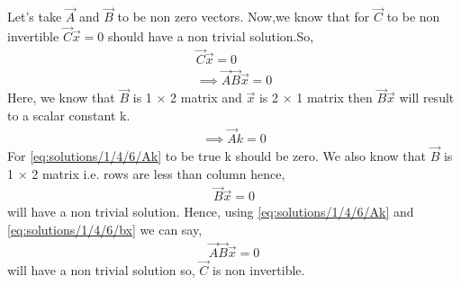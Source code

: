 %
 Let's take $\vec{A}$ and $\vec{B}$ to be non zero vectors.
 Now,we know that for $\vec{C}$ to be non invertible $\vec{C}\vec{x}=0$ should have a non trivial solution.So,
 \begin{align}
 \vec{C}\vec{x}=0\\
\implies \vec{A}\vec{B}\vec{x}=0\label{eq:solutions/1/4/6/x}
\end{align}
Here, we know that $\vec{B}$ is 1 $\times$ 2 matrix and $\vec{x}$ is 2 $\times$ 1 matrix then $\vec{B}\vec{x}$ will result to a scalar constant k.
\begin{align}
\implies \vec{A}k=0\label{eq:solutions/1/4/6/Ak}
\end{align}
For \eqref{eq:solutions/1/4/6/Ak} to be true k should be zero. We also know that $\vec{B}$ is 1 $\times$ 2 matrix i.e. rows are less than column hence,\begin{align} \vec{B}\vec{x}=0\label{eq:solutions/1/4/6/bx} \end{align}will have a non trivial solution. Hence, using \eqref{eq:solutions/1/4/6/Ak} and \eqref{eq:solutions/1/4/6/bx} we can say,
\begin{align}
\vec{A}\vec{B}\vec{x}=0
\end{align} 
will have a non trivial solution so, $\vec{C}$ is non invertible.
